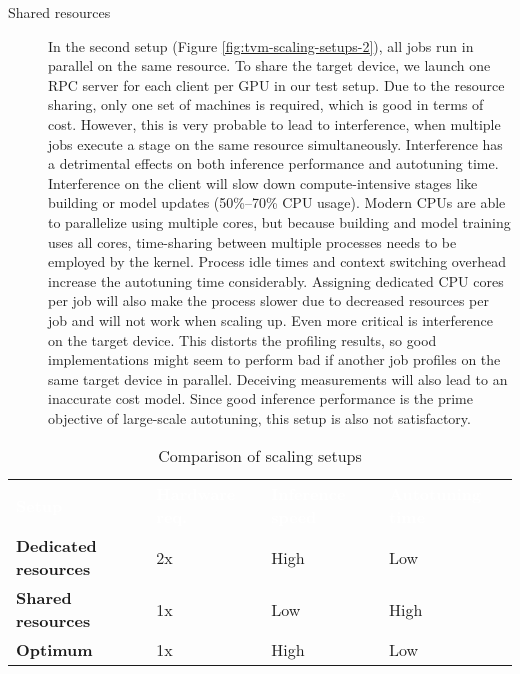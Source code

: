 \begin{description}
	\item[Shared resources] In the second setup (Figure \ref{fig:tvm-scaling-setups-2}), all jobs run in parallel on the same resource. To share the target device, we launch one RPC server for each client per GPU in our test setup. Due to the resource sharing, only one set of machines is required, which is good in terms of cost. However, this is very probable to lead to interference, when multiple jobs execute a stage on the same resource simultaneously. Interference has a detrimental effects on both inference performance and autotuning time. Interference on the client will slow down compute-intensive stages like building or model updates (50\%--70\% CPU usage). Modern CPUs are able to parallelize using multiple cores, but because building and model training uses all cores, time-sharing between multiple processes needs to be employed by the kernel. Process idle times and context switching overhead increase the autotuning time considerably. Assigning dedicated CPU cores per job will also make the process slower due to decreased resources per job and will not work when scaling up. Even more critical is interference on the target device. This distorts the profiling results, so good implementations might seem to perform bad if another job profiles on the same target device in parallel. Deceiving measurements will also lead to an inaccurate cost model. Since good inference performance is the prime objective of large-scale autotuning, this setup is also not satisfactory.
\end{description}

\begin{table}
	\newcommand\good[1]{\textcolor{hpe-green}{#1}}
	\newcommand\bad[1]{\textcolor{hpe-orange}{#1}}
	\newcommand\heading[1]{\textcolor{white}{\textbf{#1}}}
	\renewcommand{\arraystretch}{1.2}
	\sffamily
	\centering
	\begin{tabularx}{\textwidth}{l l l X}
	\rowcolor{black} \heading{Setup} & \heading{Hardware req.} & \heading{Inference speed} & \heading{Autotuning time} \vspace{2pt} \\
	\textbf{Dedicated resources} & \bad{2x} & \good{High} & \good{Low} \\
	\textbf{Shared resources} & \good{1x} & \bad{Low} & \bad{High} \\
	\textbf{Optimum} & \good{1x} & \good{High} & \good{Low} \\
	\end{tabularx}
	\caption{Comparison of scaling setups}
	\label{tab:tvm-scaling-setups}
\end{table}

